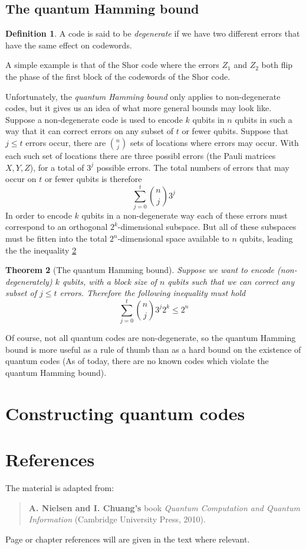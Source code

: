 \documentclass[11pt,a4paper]{article}
\theoremstyle{definition}
\newtheorem{definition}{Definition}[section]
\theoremstyle{plain}
\newtheorem{theorem}[definition]{Theorem}
\theoremstyle{remark}
\begin{document}
\subsection{The quantum Hamming bound} 

\begin{definition}
  A code is said to be \emph{degenerate} if we have two different errors that have the same effect 
  on codewords. 
  
  A simple example is that of the Shor code where the errors $Z_1$ and $Z_2$ both flip the phase of the first block of the 
  codewords of the Shor code. 
\end{definition}

Unfortunately, the \emph{quantum Hamming bound} only applies to non-degenerate codes, but it gives us an idea of what more general bounds 
may look like. Suppose a non-degenerate code is used to encode $k$ qubits in $n$ qubits in such a way that it can 
correct errors on any subset of $t$ or fewer qubits. Suppose that $j \leq t$ errors occur, there are $\binom{n}{j}$ sets of locations where errors may occur. 
With each such set of locations there are three possibl errors (the Pauli matrices $X, Y, Z$), for a total of $3^j$ possible errors. The total numbers of 
errors that may occur on $t$ or fewer qubits is therefore 
$$ \sum_{j = 0}^t \binom{n}{j} 3^j$$
In order to encode $k$ qubits in a non-degenerate way each of these errors must correspond to an orthogonal $2^k$-dimensional subspace. But all of these 
subspaces must be fitten into the total $2^n$-dimensional space available to $n$ qubits, leading the the inequality \ref{thm:quantum-hamming-bound}

\begin{theorem}[The quantum Hamming bound] \label{thm:quantum-hamming-bound}
  Suppose we want to encode (non-degenerately) $k$ qubits, with a block size of $n$ qubits such that we can correct any subset of 
  $j \leq t$ errors. Therefore the following inequality must hold 
  $$\sum_{j = 0}^{t} \binom{n}{j} 3^j 2^k \leq 2^n$$ 
\end{theorem}

Of course, not all quantum codes are non-degenerate, so the quantum Hamming bound is more useful as a rule of thumb than as a hard 
bound on the existence of quantum codes (As of today, there are no known codes which violate the quantum Hamming bound). 

\section{Constructing quantum codes}

\section{References}
The material is adapted from: 
\begin{quote}
    \textbf{A. Nielsen and I. Chuang's} book \emph{Quantum Computation and Quantum Information} (Cambridge University Press, 2010).
\end{quote}
Page or chapter references will are given in the text where relevant. 
\end{document}
